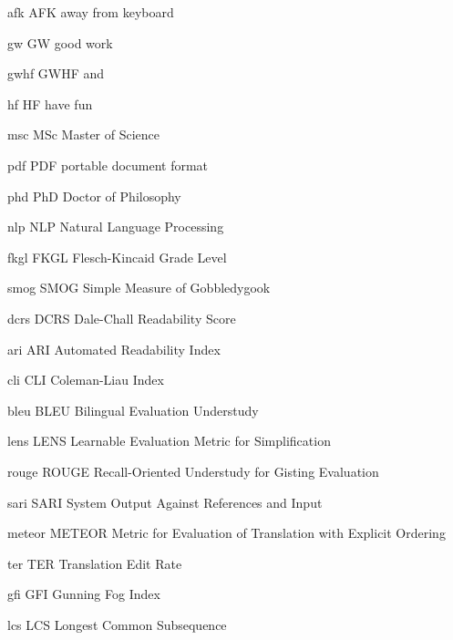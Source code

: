 \newabbreviation
{afk}
{AFK}
{away from keyboard}

\newabbreviation
{gw}
{GW}
{good work}

\newabbreviation
{gwhf}
{GWHF}
{ and }

\newabbreviation
{hf}
{HF}
{have fun}

\newabbreviation
{msc}
{MSc}
{Master of Science}

\newabbreviation
{pdf}
{PDF}
{portable document format}

\newabbreviation
{phd}
{PhD}
{Doctor of Philosophy}

\newabbreviation
{nlp}
{NLP}
{Natural Language Processing}

\newabbreviation
{fkgl}
{FKGL}
{Flesch-Kincaid Grade Level}

\newabbreviation
{smog}
{SMOG}
{Simple Measure of Gobbledygook}

\newabbreviation
{dcrs}
{DCRS}
{Dale-Chall Readability Score}

\newabbreviation
{ari}
{ARI}
{Automated Readability Index}

\newabbreviation
{cli}
{CLI}
{Coleman-Liau Index}

\newabbreviation
{bleu}
{BLEU}
{Bilingual Evaluation Understudy}

\newabbreviation
{lens}
{LENS}
{Learnable Evaluation Metric for Simplification}

\newabbreviation
{rouge}
{ROUGE}
{Recall-Oriented Understudy for Gisting Evaluation}

\newabbreviation
{sari}
{SARI}
{System Output Against References and Input}

\newabbreviation
{meteor}
{METEOR}
{Metric for Evaluation of Translation with Explicit Ordering}

\newabbreviation
{ter}
{TER}
{Translation Edit Rate}

\newabbreviation
{gfi}
{GFI}
{Gunning Fog Index}

\newabbreviation
{lcs}
{LCS}
{Longest Common Subsequence}
